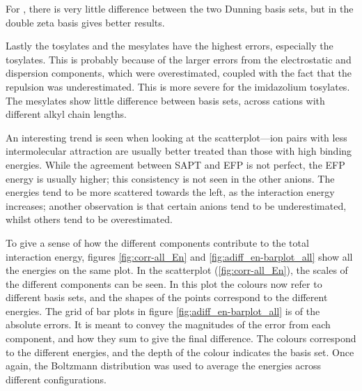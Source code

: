 \begin{footnotesize}
For , there is very little difference between the two Dunning basis sets, but in  the double zeta basis gives better results. 


Lastly the tosylates and the mesylates have the highest errors, especially the tosylates. 
This is probably because of the larger errors from the electrostatic and dispersion components, which were overestimated, coupled with the fact that the repulsion was underestimated. 
This is more severe for the imidazolium tosylates.
The mesylates show little difference between basis sets, across cations with different alkyl chain lengths.


An interesting trend is seen when looking at the scatterplot---ion pairs with less intermolecular attraction are usually better treated than those with high binding energies.
While the agreement between SAPT and EFP is not perfect, the EFP energy is usually higher; this consistency is not seen in the other anions.
The energies tend to be more scattered towards the left, as the interaction energy increases; another observation is that certain anions tend to be underestimated, whilst others tend to be overestimated.


To give a sense of how the different components contribute to the total interaction energy, figures 
\ref{fig:corr-all_En} and
\ref{fig:adiff_en-barplot_all}
show all the energies on the same plot.
In the scatterplot (\ref{fig:corr-all_En}), the scales of the different components can be seen.
In this plot the colours now refer to different basis sets, and the shapes of the points correspond to the different energies.
The grid of bar plots in figure \ref{fig:adiff_en-barplot_all} is of the absolute errors.
It is meant to convey the magnitudes of the error from each component, and how they sum to give the final difference.
The colours correspond to the different energies, and the depth of the colour indicates the basis set.
Once again, the Boltzmann distribution was used to average the energies across different configurations.


\end{footnotesize}
